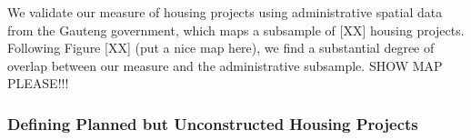 \documentclass[12pt]{article}
\begin{document}

We validate our measure of housing projects using administrative spatial data from the Gauteng government, which maps a subsample of [XX] housing projects.  Following Figure [XX] (put a nice map here), we find a substantial degree of overlap between our measure and the administrative subsample.  SHOW MAP PLEASE!!!

\subsubsection{Defining Planned but Unconstructed Housing Projects}
\end{document}

